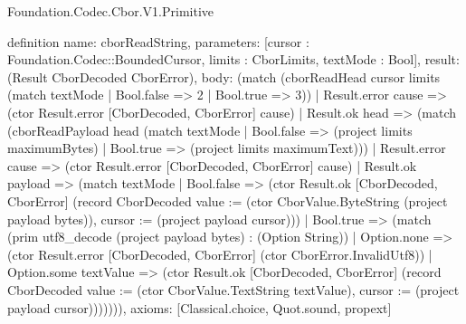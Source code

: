 \begin{lexlean}{Foundation.Codec.Cbor.V1.Primitive}
\begin{semanticmodule}
definition{
  name: cborReadString,
  parameters: [cursor : Foundation.Codec::BoundedCursor, limits : CborLimits, textMode : Bool],
  result: (Result CborDecoded CborError),
  body: (match (cborReadHead cursor limits (match textMode | Bool.false => 2 | Bool.true => 3))
    | Result.error cause => (ctor Result.error [CborDecoded, CborError] cause)
    | Result.ok head => (match (cborReadPayload head (match textMode
        | Bool.false => (project limits maximumBytes)
        | Bool.true => (project limits maximumText)))
      | Result.error cause => (ctor Result.error [CborDecoded, CborError] cause)
      | Result.ok payload => (match textMode
        | Bool.false => (ctor Result.ok [CborDecoded, CborError] (record CborDecoded {value := (ctor CborValue.ByteString (project payload bytes)), cursor := (project payload cursor)}))
        | Bool.true => (match (prim utf8_decode (project payload bytes) : (Option String))
          | Option.none => (ctor Result.error [CborDecoded, CborError] (ctor CborError.InvalidUtf8))
          | Option.some textValue => (ctor Result.ok [CborDecoded, CborError] (record CborDecoded {value := (ctor CborValue.TextString textValue), cursor := (project payload cursor)})))))),
  axioms: [Classical.choice, Quot.sound, propext]
}


\end{semanticmodule}
\end{lexlean}
